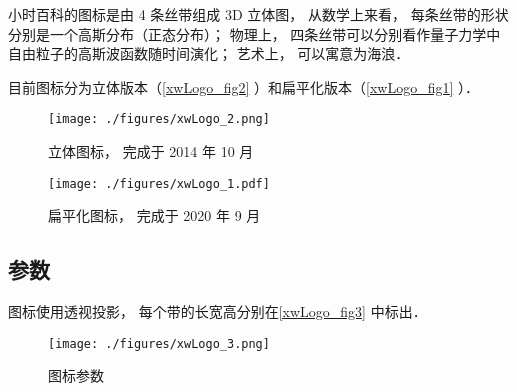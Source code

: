 
\begin{issues}
\issueTODO
\end{issues}

小时百科的图标是由 4 条丝带组成 3D 立体图， 从数学上来看， 每条丝带的形状分别是一个高斯分布（正态分布）； 物理上， 四条丝带可以分别看作量子力学中自由粒子的高斯波函数随时间演化； 艺术上， 可以寓意为海浪．

目前图标分为立体版本（\autoref{xwLogo_fig2} ）和扁平化版本（\autoref{xwLogo_fig1} ）．

\begin{figure}[ht]
\centering
\texttt{[image: ./figures/xwLogo\_2.png]}
\caption{立体图标， 完成于 2014 年 10 月} \label{xwLogo_fig2}
\end{figure}

\begin{figure}[ht]
\centering
\texttt{[image: ./figures/xwLogo\_1.pdf]}
\caption{扁平化图标， 完成于 2020 年 9 月} \label{xwLogo_fig1}
\end{figure}

\subsection{参数}
图标使用透视投影， 每个带的长宽高分别在\autoref{xwLogo_fig3} 中标出．
\begin{figure}[ht]
\centering
\texttt{[image: ./figures/xwLogo\_3.png]}
\caption{图标参数} \label{xwLogo_fig3}
\end{figure}
